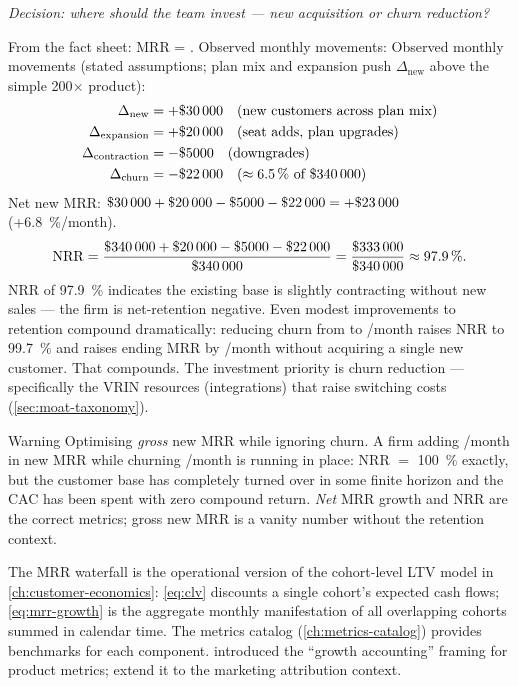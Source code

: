 \begin{example}
\emph{Decision: where should the team invest --- new acquisition or churn reduction?}

From the fact sheet: MRR = . Observed monthly movements:
Observed monthly movements (stated assumptions; plan mix and expansion push
\(\Delta_{\text{new}}\) above the simple \num{200}\(\times\) product):
\[
  \begin{aligned}
    \Delta_{\text{new}} &= +\$\num{30000} \quad (\text{new customers across plan mix})\\
    \Delta_{\text{expansion}} &= +\$\num{20000} \quad (\text{seat adds, plan upgrades})\\
    \Delta_{\text{contraction}} &= -\$\num{5000} \quad (\text{downgrades})\\
    \Delta_{\text{churn}} &= -\$\num{22000} \quad (\approx\qty{6.5}{\percent}\text{ of }\$\num{340000})
  \end{aligned}
\]
Net new MRR: $\$\num{30000}+\$\num{20000}-\$\num{5000}-\$\num{22000}=+\$\num{23000}$
(+\qty{6.8}{\percent}/month).
\[
  \mathrm{NRR} = \frac{\$\num{340000}+\$\num{20000}-\$\num{5000}-\$\num{22000}}{\$\num{340000}}
               = \frac{\$\num{333000}}{\$\num{340000}} \approx \qty{97.9}{\percent}.
\]
NRR of \qty{97.9}{\percent} indicates the existing base is slightly contracting without
new sales --- the firm is net-retention negative. Even modest improvements to retention
compound dramatically: reducing churn from  to /month
raises NRR to \qty{99.7}{\percent} and raises ending MRR by /month
without acquiring a single new customer. That  compounds. The investment
priority is churn reduction --- specifically the VRIN resources (integrations) that
raise switching costs (\cref{sec:moat-taxonomy}).
\end{example}

\begin{admonition}{Warning}
Optimising \emph{gross} new MRR while ignoring churn. A firm adding /month
in new MRR while churning /month is running in place: NRR $=$ \qty{100}{\percent}
exactly, but the customer base has completely turned over in some finite horizon and the
CAC has been spent with zero compound return. \emph{Net} MRR growth and NRR are the
correct metrics; gross new MRR is a vanity number without the retention context.
\end{admonition}

The MRR waterfall is the operational version of the cohort-level LTV model in
\cref{ch:customer-economics}: \cref{eq:clv} discounts a single cohort's expected cash
flows; \cref{eq:mrr-growth} is the aggregate monthly manifestation of all overlapping
cohorts summed in calendar time. The metrics catalog (\cref{ch:metrics-catalog}) provides
benchmarks for each component. \textcite{ries2011} introduced the ``growth accounting''
framing for product metrics; \textcite{bendle2020marketing} extend it to the marketing
attribution context.

